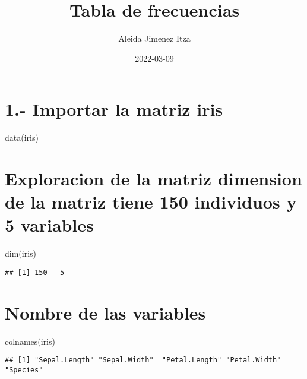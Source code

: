 \documentclass[
]{article}
\title{Tabla de frecuencias}
\author{Aleida Jimenez Itza}
\date{2022-03-09}
\newenvironment{Shaded}{\begin{snugshade}}{\end{snugshade}}
\newcommand{\FunctionTok}[1]{\textcolor[rgb]{0.00,0.00,0.00}{#1}}
\newcommand{\NormalTok}[1]{#1}
\begin{document}
\maketitle

\hypertarget{importar-la-matriz-iris}{%
\section{1.- Importar la matriz iris}\label{importar-la-matriz-iris}}

\begin{Shaded}
\begin{Highlighting}[]
\FunctionTok{data}\NormalTok{(iris)}
\end{Highlighting}
\end{Shaded}

\hypertarget{exploracion-de-la-matriz-dimension-de-la-matriz-tiene-150-individuos-y-5-variables}{%
\section{Exploracion de la matriz dimension de la matriz tiene 150
individuos y 5
variables}\label{exploracion-de-la-matriz-dimension-de-la-matriz-tiene-150-individuos-y-5-variables}}

\begin{Shaded}
\begin{Highlighting}[]
\FunctionTok{dim}\NormalTok{(iris)}
\end{Highlighting}
\end{Shaded}

\begin{verbatim}
## [1] 150   5
\end{verbatim}

\hypertarget{nombre-de-las-variables}{%
\section{Nombre de las variables}\label{nombre-de-las-variables}}

\begin{Shaded}
\begin{Highlighting}[]
\FunctionTok{colnames}\NormalTok{(iris) }
\end{Highlighting}
\end{Shaded}

\begin{verbatim}
## [1] "Sepal.Length" "Sepal.Width"  "Petal.Length" "Petal.Width"  "Species"
\end{verbatim}
\end{document}
